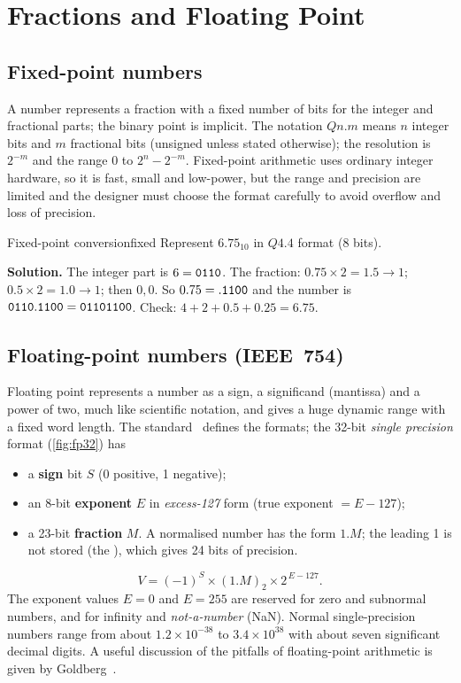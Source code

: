 \section{Fractions and Floating Point}\label{sec:fixfloat}
\subsection{Fixed-point numbers}
A  number represents a fraction with a fixed number of bits for the integer and fractional parts; the binary point is implicit. The notation $Qn.m$ means $n$ integer bits and $m$ fractional bits (unsigned unless stated otherwise); the resolution is $2^{-m}$ and the range $0$ to $2^n-2^{-m}$. Fixed-point arithmetic uses ordinary integer hardware, so it is fast, small and low-power, but the range and precision are limited and the designer must choose the format carefully to avoid overflow and loss of precision.

\begin{example}{Fixed-point conversion}{fixed}
Represent $6.75_{10}$ in $Q4.4$ format (8 bits).

\textbf{Solution.} The integer part is $6=\mathtt{0110}$. The fraction: $0.75\times2=1.5\to1$; $0.5\times2=1.0\to1$; then $0, 0$. So $0.75=\mathtt{.1100}$ and the number is $\mathtt{0110.1100}=\mathtt{01101100}$. Check: $4+2+0.5+0.25=6.75$.
\end{example}

\subsection{Floating-point numbers (IEEE~754)}
Floating point represents a number as a sign, a significand (mantissa) and a power of two, much like scientific notation, and gives a huge dynamic range with a fixed word length. The  standard~\cite{ieee754} defines the formats; the 32-bit \emph{single precision} format (\cref{fig:fp32}) has
\begin{itemize}
  \item a \textbf{sign} bit $S$ (0 positive, 1 negative);
  \item an 8-bit \textbf{exponent} $E$ in \emph{excess-127} form (true exponent $=E-127$);
  \item a 23-bit \textbf{fraction} $M$. A normalised number has the form $1.M$; the leading 1 is not stored (the ), which gives 24 bits of precision.
\end{itemize}
\begin{equation}
  V = (-1)^S\times(1.M)_2\times2^{\,E-127}.
  \label{eq:ieee}
\end{equation}
The exponent values $E=0$ and $E=255$ are reserved for zero and subnormal numbers, and for infinity and \emph{not-a-number} (NaN). Normal single-precision numbers range from about $1.2\times10^{-38}$ to $3.4\times10^{38}$ with about seven significant decimal digits. A useful discussion of the pitfalls of floating-point arithmetic is given by Goldberg~\cite{goldberg1991}.

